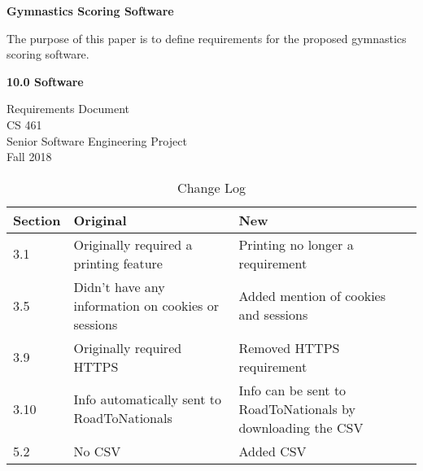 \documentclass[letterpaper,10pt,draftclsnofoot,onecolumn,]{article}
\begin{document}
\noindent
\begin{titlepage}
    \begin{center}
        \vspace*{1cm}
        
        \textbf{Gymnastics Scoring Software}
        
        \vspace{0.5cm}
        The purpose of this paper is to define requirements for the proposed gymnastics scoring software.
        
        \vspace{1.5cm}
        
        \textbf{10.0 Software}
        
        Requirements Document\\
        CS 461\\
        Senior Software Engineering Project\\
        Fall 2018
        
    \end{center}
\end{titlepage}

\tableofcontents
\newpage

\begin{table}[htbp]
    \centering
    \small
    \setlength\tabcolsep{2pt}
    \caption{Change Log}
    \label{tab:change-log}
    \begin{tabular}{@{}lll@{}}
        \toprule
        Section & Original                                           & New                                  \\ \midrule
        3.1     & Originally required a printing feature             & Printing no longer a requirement     \\
        3.5     & Didn't have any information on cookies or sessions & Added mention of cookies and sessions\\
        3.9     & Originally required HTTPS                          & Removed HTTPS requirement            \\
        3.10    & Info automatically sent to RoadToNationals         & Info can be sent to RoadToNationals by downloading the CSV \\
        5.2     & No CSV                                             & Added CSV                            \\ \bottomrule
    \end{tabular}
\end{table}
\end{document}
